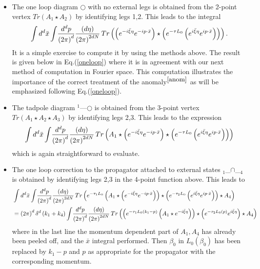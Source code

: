 \documentclass[a4paper,11pt]{article}
\begin{document}
\begin{itemize}
\item The one loop diagram $\bigcirc $ with no external legs is obtained
from the 2-point vertex $Tr\left( A_{1}\star A_{2}\right) $ by identifying
legs 1,2. This leads to the integral
\begin{equation}
\int d^d\bar{x}\int\! \frac{d^dp}{\left( 2\pi \right) ^{d}}\frac{(d\eta) }{%
\left( 2\pi \right) ^{2dN}}\,Tr\left( \left( e^{-i\bar{\xi}\eta }e^{-ip\cdot
\bar{x}}\right) \star \left( e^{-\tau L_{0}}\left( e^{i\bar{\xi}\eta
}e^{ip\cdot \bar{x}}\right) \right) \right) .
\end{equation}%
It is a simple exercise to compute it by using the methods above. The result
is given below in Eq.(\ref{oneloop}) where it is in agreement with our next
method of computation in Fourier space. This computation illustrates the
importance of the correct treatment of the anomaly$^{\ref{anom}}$ as will be
emphasized following Eq.(\ref{oneloop}).

\item The tadpole diagram $^{1}$---$\bigcirc $ is obtained from the 3-point
vertex $Tr\left( A_{1}\star A_{2}\star A_{3}\right) $ by identifying legs
2,3. This leads to the expression
\begin{equation*}
\int d^d\bar{x}\int\! \frac{d^dp}{\left( 2\pi \right) ^{d}}\frac{(d\eta) }{%
\left( 2\pi \right) ^{2dN}}\,Tr\left( A_{1}\star \left( e^{-i\bar{\xi}\eta
}e^{-ip\cdot \bar{x}}\right) \star \left( e^{-\tau L_{0}}\left( e^{i\bar{\xi}%
\eta }e^{ip\cdot \bar{x}}\right) \right) \right)
\end{equation*}%
which is again straightforward to evaluate.

\item The one loop correction to the propagator attached to external states $%
_{1}$\_\underline{$\cap $}\_$_{4}$ is obtained by identifying legs 2,3 in
the 4-point function above. This leads to
\begin{align*}
& \int d^d\bar{x}\int\! \frac{d^dp}{\left( 2\pi \right) ^{d}}\frac{(d\eta) }{%
\left( 2\pi \right) ^{2dN}}\,Tr\left( e^{-\tau _{1}L_{0}}\left( A_{1}\star
\left( e^{-i\bar{\xi}\eta }e^{-ip\cdot \bar{x}}\right) \right) \star \left(
e^{-\tau _{2}L_{0}}\left( e^{i\bar{\xi}\eta }e^{ip\cdot \bar{x}}\right)
\right) \star A_{4}\right) \\
& =\left( 2\pi \right) ^{d}\delta^d \left( k_{1}+k_{4}\right) \int\! \frac{%
d^dp}{\left( 2\pi \right)^{d}}\frac{(d\eta) }{\left( 2\pi \right)^{2dN}}%
\,Tr\left( \left( e^{-\tau _{1}L_{0}\left( k_{1}-p\right) }\left( A_{1}\star
e^{-i\bar{\xi}\eta }\right) \right) \star \left( e^{-\tau _{2}L_{0}\left(
p\right) }e^{i\bar{\xi}\eta }\right) \star A_{4}\right)
\end{align*}%
where in the last line the momentum dependent part of $A_{1},A_{4}$ has
already been peeled off, and the $\bar{x}$ integral performed. Then $\beta
_{0}$ in $L_{0}\left( \beta _{0}\right) $ has been replaced by $k_{1}-p$ and
$p$ as appropriate for the propagator with the corresponding momentum.
\end{itemize}
\end{document}
